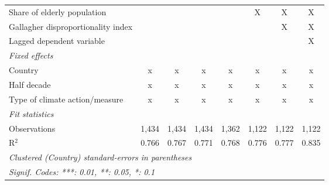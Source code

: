 \begin{tabular}{lccccccc}
   Share of elderly population                                                                 &         &         &         &         & X             & X             & X\\  
   Gallagher disproportionality index                                                          &         &         &         &         &               & X             & X\\  
   Lagged dependent variable                                                                   &         &         &         &         &               &               & X\\  
   \emph{Fixed effects}\\
   Country                                                                                     & x       & x       & x       & x       & x             & x             & x\\  
   Half decade                                                                                 & x       & x       & x       & x       & x             & x             & x\\  
   Type of climate action/measure                                                              & x       & x       & x       & x       & x             & x             & x\\  
   \midrule \emph{Fit statistics}\\
   Observations                                                                                & 1,434   & 1,434   & 1,434   & 1,362   & 1,122         & 1,122         & 1,122\\  
   R$^2$                                                                                       & 0.766   & 0.767   & 0.771   & 0.768   & 0.776         & 0.777         & 0.835\\  
   \midrule
   \multicolumn{8}{l}{\emph{Clustered (Country) standard-errors in parentheses}}\\
   \multicolumn{8}{l}{\emph{Signif. Codes: ***: 0.01, **: 0.05, *: 0.1}}\\
\end{tabular}
\par\endgroup


